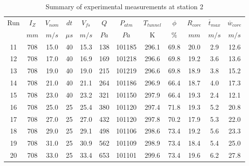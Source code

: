 \begin{table}[H]
\begin{center}
\begin{tabular}{|cccccccccccc|}
	\hline
	Run & $I_Z$ & $V_{nom}$ & $dt$ & $V_{fs}$ & $Q$ & $P_{atm}$ & $T_{tunnel}$ & $\phi$ & $R_{core}$ & $\overline{t}_{max}$ & $\overline{w}_{core}$\\
	  & $mm$ & $m/s$ & $\mu s$ & $m/s$ & $Pa$ & $Pa$ & K & $\%$ & $mm$ & $m/s$ & $m/s$\\
	\hline
	11 & 708 & 15.0 & 40 & 15.3 & 138 & 101185 & 296.1 & 69.8 & 20.0 & 2.9 & 12.6\\
	12 & 708 & 17.0 & 40 & 16.9 & 169 & 101218 & 296.6 & 69.8 & 19.2 & 3.6 & 13.6\\
	13 & 708 & 19.0 & 40 & 19.0 & 215 & 101219 & 296.6 & 69.8 & 18.9 & 3.8 & 15.2\\
	14 & 708 & 21.0 & 40 & 21.1 & 264 & 101186 & 296.9 & 66.4 & 18.7 & 4.0 & 17.3\\
	15 & 708 & 23.0 & 40 & 23.2 & 321 & 101150 & 297.9 & 66.4 & 19.3 & 2.4 & 12.1\\
	16 & 708 & 25.0 & 25 & 25.4 & 380 & 101120 & 297.4 & 71.8 & 19.3 & 5.2 & 20.8\\
	17 & 708 & 27.0 & 25 & 27.0 & 432 & 101120 & 297.8 & 70.2 & 17.9 & 5.3 & 22.0\\
	18 & 708 & 29.0 & 25 & 29.1 & 498 & 101106 & 298.6 & 73.4 & 19.2 & 5.6 & 23.3\\
	19 & 708 & 31.0 & 25 & 30.9 & 562 & 101109 & 298.9 & 73.4 & 18.4 & 5.4 & 25.0\\
	20 & 708 & 33.0 & 25 & 33.4 & 653 & 101101 & 299.6 & 73.4 & 19.6 & 6.2 & 27.8\\
	\hline
\end{tabular}
\caption{Summary of experimental measurements at station 2}
\label{table:experiment_results_2}
\end{center}
\end{table}
